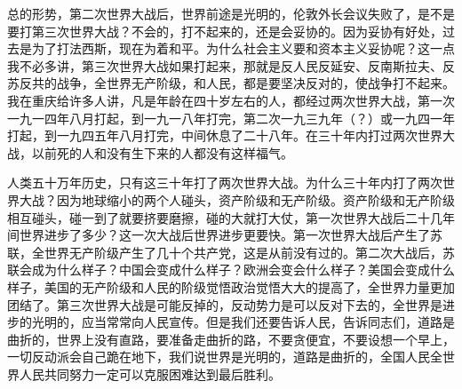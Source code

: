 总的形势，第二次世界大战后，世界前途是光明的，伦敦外长会议失败了，是不是要打第三次世界大战？不会的，打不起来的，还是会妥协的。因为妥协有好处，过去是为了打法西斯，现在为着和平。为什么社会主义要和资本主义妥协呢？这一点我不必多讲，第三次世界大战如果打起来，那就是反人民反延安、反南斯拉夫、反苏反共的战争，全世界无产阶级，和人民，都是要坚决反对的，使战争打不起来。我在重庆给许多人讲，凡是年龄在四十岁左右的人，都经过两次世界大战，第一次一九一四年八月打起，到一九一八年打完，第二次一九三九年（？）或一九四一年打起，到一九四五年八月打完，中间休息了二十八年。在三十年内打过两次世界大战，以前死的人和没有生下来的人都没有这样福气。

人类五十万年历史，只有这三十年打了两次世界大战。为什么三十年内打了两次世界大战？因为地球缩小的两个人碰头，资产阶级和无产阶级。资产阶级和无产阶级相互碰头，碰一到了就要挤要磨擦，碰的大就打大仗，第一次世界大战后二十几年间世界进步了多少？这一次大战后世界进步更要快。第一次世界大战后产生了苏联，全世界无产阶级产生了几十个共产党，这是从前没有过的。第二次大战后，苏联会成为什么样子？中国会变成什么样子？欧洲会变会什么样子？美国会变成什么样子，美国的无产阶级和人民的阶级觉悟政治觉悟大大的提高了，全世界力量更加团结了。第三次世界大战是可能反掉的，反动势力是可以反对下去的，全世界是进步的光明的，应当常常向人民宣传。但是我们还要告诉人民，告诉同志们，道路是曲折的，世界上没有直路，要准备走曲折的路，不要贪便宜，不要设想一个早上，一切反动派会自己跪在地下，我们说世界是光明的，道路是曲折的，全国人民全世界人民共同努力一定可以克服困难达到最后胜利。

